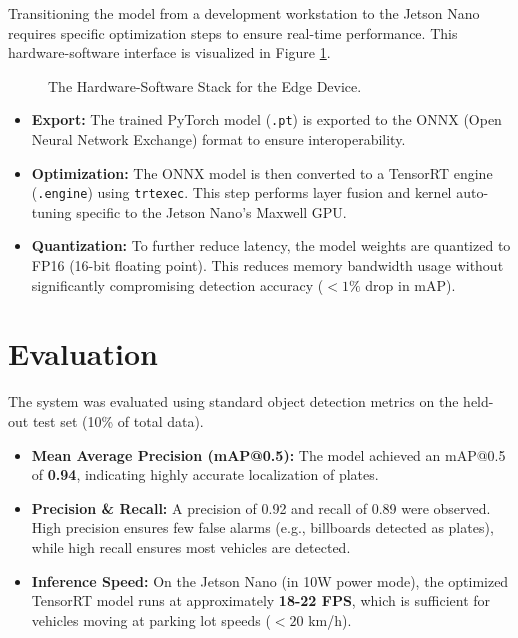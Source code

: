 Transitioning the model from a development workstation to the Jetson Nano requires specific optimization steps to ensure real-time performance. This hardware-software interface is visualized in Figure \ref{fig:tech_stack}.

\begin{figure}[htbp]
	\centering
	
	\caption{The Hardware-Software Stack for the Edge Device.}
	\label{fig:tech_stack}
\end{figure}

\begin{itemize}
	\item \textbf{Export:} The trained PyTorch model (\texttt{.pt}) is exported to the ONNX (Open Neural Network Exchange) format to ensure interoperability.
	\item \textbf{Optimization:} The ONNX model is then converted to a TensorRT engine (\texttt{.engine}) using \texttt{trtexec}. This step performs layer fusion and kernel auto-tuning specific to the Jetson Nano's Maxwell GPU.
	\item \textbf{Quantization:} To further reduce latency, the model weights are quantized to FP16 (16-bit floating point). This reduces memory bandwidth usage without significantly compromising detection accuracy ($<1\%$ drop in mAP).
\end{itemize}

\section{Evaluation}
\label{sec:evaluation}

The system was evaluated using standard object detection metrics on the held-out test set (10\% of total data).

\begin{itemize}
	\item \textbf{Mean Average Precision (mAP@0.5):} The model achieved an mAP@0.5 of \textbf{0.94}, indicating highly accurate localization of plates.
	\item \textbf{Precision \& Recall:} A precision of 0.92 and recall of 0.89 were observed. High precision ensures few false alarms (e.g., billboards detected as plates), while high recall ensures most vehicles are detected.
	\item \textbf{Inference Speed:} On the Jetson Nano (in 10W power mode), the optimized TensorRT model runs at approximately \textbf{18-22 FPS}, which is sufficient for vehicles moving at parking lot speeds ($<20$ km/h).
\end{itemize}

